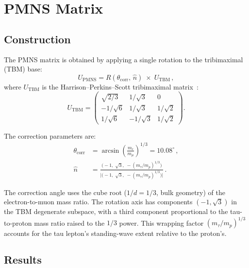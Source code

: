 \documentclass[12pt,a4paper]{article}
\begin{document}
\section{PMNS Matrix}

\subsection{Construction}

The PMNS matrix is obtained by applying a single rotation to the tribimaximal (TBM) base:
\begin{equation}
  U_{\mathrm{PMNS}} = R(\theta_{\mathrm{corr}},\,\hat{n})\;\times\;U_{\mathrm{TBM}}\,,
  \label{eq:pmns_construction}
\end{equation}
where $U_{\mathrm{TBM}}$ is the Harrison--Perkins--Scott tribimaximal matrix~\cite{harrison2002}:
\begin{equation}
  U_{\mathrm{TBM}} = \begin{pmatrix}
    \sqrt{2/3}  & 1/\sqrt{3}  & 0 \\[2pt]
    -1/\sqrt{6} & 1/\sqrt{3}  & 1/\sqrt{2} \\[2pt]
    1/\sqrt{6}  & -1/\sqrt{3} & 1/\sqrt{2}
  \end{pmatrix}.
  \label{eq:tbm}
\end{equation}

The correction parameters are:
\begin{equation}
\boxed{\;
\begin{aligned}
  \theta_{\mathrm{corr}} &= \arcsin\!\left(\frac{m_e}{m_\mu}\right)^{\!1/3}
    = 10.08^\circ\,,\\[6pt]
  \hat{n} &= \frac{\bigl(-1,\;\sqrt{3},\;-(m_\tau/m_p)^{1/3}\bigr)}
    {\bigl|\bigl(-1,\;\sqrt{3},\;-(m_\tau/m_p)^{1/3}\bigr)\bigr|}\,.
\end{aligned}
\;}
\label{eq:pmns_params}
\end{equation}

The correction angle uses the cube root ($1/d=1/3$, bulk geometry) of the electron-to-muon mass ratio. The rotation axis has components $(-1,\sqrt{3})$ in the TBM degenerate subspace, with a third component proportional to the tau-to-proton mass ratio raised to the $1/3$ power. This wrapping factor $(m_\tau/m_p)^{1/3}$ accounts for the tau lepton's standing-wave extent relative to the proton's.

\subsection{Results}
\end{document}
